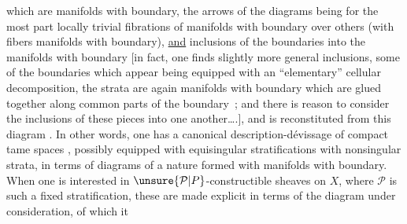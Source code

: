 %
which are manifolds with boundary, the  arrows of the
diagrams being for the most part
locally trivial fibrations of manifolds with boundary over others
(with fibers manifolds with boundary), \uline{and}  inclusions
of the boundaries into the manifolds with boundary \deleted{(}[in
fact, one finds slightly
more general inclusions, some of the boundaries which appear
being equipped with an
``elementary'' cellular decomposition,  the
 strata are again manifolds with boundary which
are glued together along common parts of the
boundary~; and there is reason to consider  the inclusions
of these pieces into one
another\ldots.\deleted{)}], and is reconstituted from
this diagram . In other words, one
has a canonical description-dévissage
of compact tame spaces , possibly
equipped with equisingular stratifications
with nonsingular strata, in terms of  diagrams
of a  nature formed with manifolds
with boundary. When one is interested in $\unsure{\mathcal{P}|P}$-constructible sheaves
on $X$, where $\mathcal{P}$ is such a
fixed stratification, these are made explicit in
terms of the diagram under consideration, of which it
